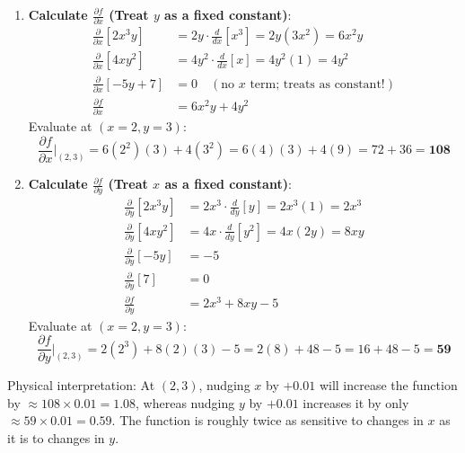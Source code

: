 \begin{enumerate}
    \item \textbf{Calculate $\frac{\partial f}{\partial x}$ (Treat $y$ as a fixed constant)}:
    \begin{align*}
    \frac{\partial}{\partial x}[2x^3 y] &= 2y \cdot \frac{d}{dx}[x^3] = 2y(3x^2) = 6x^2 y \\
    \frac{\partial}{\partial x}[4x y^2] &= 4y^2 \cdot \frac{d}{dx}[x] = 4y^2(1) = 4y^2 \\
    \frac{\partial}{\partial x}[-5y + 7] &= 0 \quad (\text{no } x \text{ term; treats as constant!}) \\
    \frac{\partial f}{\partial x} &= 6x^2 y + 4y^2
    \end{align*}
    Evaluate at $(x=2, y=3)$:
    \begin{equation*}
    \frac{\partial f}{\partial x}\Big|_{(2,3)} = 6(2^2)(3) + 4(3^2) = 6(4)(3) + 4(9) = 72 + 36 = \mathbf{108}
    \end{equation*}

    \item \textbf{Calculate $\frac{\partial f}{\partial y}$ (Treat $x$ as a fixed constant)}:
    \begin{align*}
    \frac{\partial}{\partial y}[2x^3 y] &= 2x^3 \cdot \frac{d}{dy}[y] = 2x^3(1) = 2x^3 \\
    \frac{\partial}{\partial y}[4x y^2] &= 4x \cdot \frac{d}{dy}[y^2] = 4x(2y) = 8xy \\
    \frac{\partial}{\partial y}[-5y] &= -5 \\
    \frac{\partial}{\partial y}[7] &= 0 \\
    \frac{\partial f}{\partial y} &= 2x^3 + 8xy - 5
    \end{align*}
    Evaluate at $(x=2, y=3)$:
    \begin{equation*}
    \frac{\partial f}{\partial y}\Big|_{(2,3)} = 2(2^3) + 8(2)(3) - 5 = 2(8) + 48 - 5 = 16 + 48 - 5 = \mathbf{59}
    \end{equation*}
\end{enumerate}

Physical interpretation: At $(2, 3)$, nudging $x$ by $+0.01$ will increase the function by $\approx 108 \times 0.01 = 1.08$, whereas nudging $y$ by $+0.01$ increases it by only $\approx 59 \times 0.01 = 0.59$. The function is roughly twice as sensitive to changes in $x$ as it is to changes in $y$.

